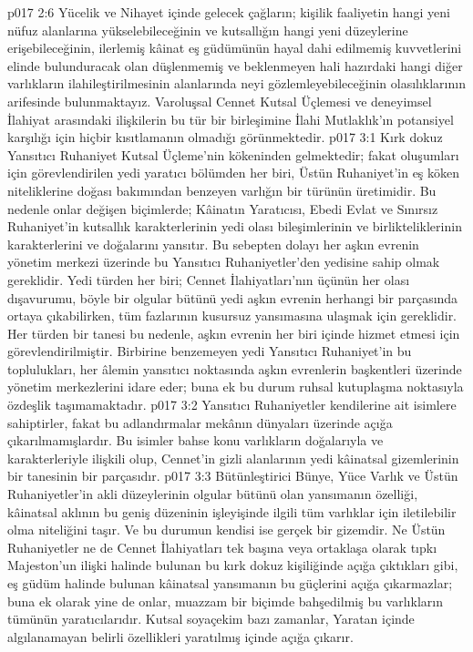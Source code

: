 \vs p017 2:6 Yücelik ve Nihayet içinde gelecek çağların; kişilik faaliyetin hangi yeni nüfuz alanlarına yükselebileceğinin ve kutsallığın hangi yeni düzeylerine erişebileceğinin, ilerlemiş kâinat eş güdümünün hayal dahi edilmemiş kuvvetlerini elinde bulunduracak olan düşlenmemiş ve beklenmeyen hali hazırdaki hangi diğer varlıkların ilahileştirilmesinin alanlarında neyi gözlemleyebileceğinin olasılıklarının arifesinde bulunmaktayız. Varoluşsal Cennet Kutsal Üçlemesi ve deneyimsel İlahiyat arasındaki ilişkilerin bu tür bir birleşimine İlahi Mutlaklık’ın potansiyel karşılığı için hiçbir kısıtlamanın olmadığı görünmektedir.
\vs p017 3:1 Kırk dokuz Yansıtıcı Ruhaniyet Kutsal Üçleme’nin kökeninden gelmektedir; fakat oluşumları için görevlendirilen yedi yaratıcı bölümden her biri, Üstün Ruhaniyet’in eş köken niteliklerine doğası bakımından benzeyen varlığın bir türünün üretimidir. Bu nedenle onlar değişen biçimlerde; Kâinatın Yaratıcısı, Ebedi Evlat ve Sınırsız Ruhaniyet’in kutsallık karakterlerinin yedi olası bileşimlerinin ve birlikteliklerinin karakterlerini ve doğalarını yansıtır. Bu sebepten dolayı her aşkın evrenin yönetim merkezi üzerinde bu Yansıtıcı Ruhaniyetler’den yedisine sahip olmak gereklidir. Yedi türden her biri; Cennet İlahiyatları’nın üçünün her olası dışavurumu, böyle bir olgular bütünü yedi aşkın evrenin herhangi bir parçasında ortaya çıkabilirken, tüm fazlarının kusursuz yansımasına ulaşmak için gereklidir. Her türden bir tanesi bu nedenle, aşkın evrenin her biri içinde hizmet etmesi için görevlendirilmiştir. Birbirine benzemeyen yedi Yansıtıcı Ruhaniyet’in bu toplulukları, her âlemin yansıtıcı noktasında aşkın evrenlerin başkentleri üzerinde yönetim merkezlerini idare eder; buna ek bu durum ruhsal kutuplaşma noktasıyla özdeşlik taşımamaktadır.
\vs p017 3:2 Yansıtıcı Ruhaniyetler kendilerine ait isimlere sahiptirler, fakat bu adlandırmalar mekânın dünyaları üzerinde açığa çıkarılmamışlardır. Bu isimler bahse konu varlıkların doğalarıyla ve karakterleriyle ilişkili olup, Cennet’in gizli alanlarının yedi kâinatsal gizemlerinin bir tanesinin bir parçasıdır.
\vs p017 3:3 Bütünleştirici Bünye, Yüce Varlık ve Üstün Ruhaniyetler’in akli düzeylerinin olgular bütünü olan yansımanın özelliği, kâinatsal aklının bu geniş düzeninin işleyişinde ilgili tüm varlıklar için iletilebilir olma niteliğini taşır. Ve bu durumun kendisi ise gerçek bir gizemdir. Ne Üstün Ruhaniyetler ne de Cennet İlahiyatları tek başına veya ortaklaşa olarak tıpkı Majeston’un ilişki halinde bulunan bu kırk dokuz kişiliğinde açığa çıktıkları gibi, eş güdüm halinde bulunan kâinatsal yansımanın bu güçlerini açığa çıkarmazlar; buna ek olarak yine de onlar, muazzam bir biçimde bahşedilmiş bu varlıkların tümünün yaratıcılarıdır. Kutsal soyaçekim bazı zamanlar, Yaratan içinde algılanamayan belirli özellikleri yaratılmış içinde açığa çıkarır.
